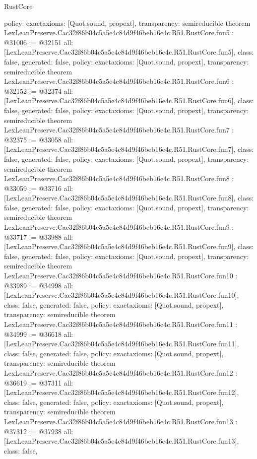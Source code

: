 \begin{lexlean}{RustCore}
\begin{coremodule}
{  policy: exact{axioms: [Quot.sound, propext]},
  transparency: semireducible
}
theorem LexLeanPreserve.Cac32f86b04c5a5e4c84d9f46beb16e4c.R51.RustCore.fun5 : @31006 := @32151 {
  all: [LexLeanPreserve.Cac32f86b04c5a5e4c84d9f46beb16e4c.R51.RustCore.fun5],
  class: false,
  generated: false,
  policy: exact{axioms: [Quot.sound, propext]},
  transparency: semireducible
}
theorem LexLeanPreserve.Cac32f86b04c5a5e4c84d9f46beb16e4c.R51.RustCore.fun6 : @32152 := @32374 {
  all: [LexLeanPreserve.Cac32f86b04c5a5e4c84d9f46beb16e4c.R51.RustCore.fun6],
  class: false,
  generated: false,
  policy: exact{axioms: [Quot.sound, propext]},
  transparency: semireducible
}
theorem LexLeanPreserve.Cac32f86b04c5a5e4c84d9f46beb16e4c.R51.RustCore.fun7 : @32375 := @33058 {
  all: [LexLeanPreserve.Cac32f86b04c5a5e4c84d9f46beb16e4c.R51.RustCore.fun7],
  class: false,
  generated: false,
  policy: exact{axioms: [Quot.sound, propext]},
  transparency: semireducible
}
theorem LexLeanPreserve.Cac32f86b04c5a5e4c84d9f46beb16e4c.R51.RustCore.fun8 : @33059 := @33716 {
  all: [LexLeanPreserve.Cac32f86b04c5a5e4c84d9f46beb16e4c.R51.RustCore.fun8],
  class: false,
  generated: false,
  policy: exact{axioms: [Quot.sound, propext]},
  transparency: semireducible
}
theorem LexLeanPreserve.Cac32f86b04c5a5e4c84d9f46beb16e4c.R51.RustCore.fun9 : @33717 := @33988 {
  all: [LexLeanPreserve.Cac32f86b04c5a5e4c84d9f46beb16e4c.R51.RustCore.fun9],
  class: false,
  generated: false,
  policy: exact{axioms: [Quot.sound, propext]},
  transparency: semireducible
}
theorem LexLeanPreserve.Cac32f86b04c5a5e4c84d9f46beb16e4c.R51.RustCore.fun10 : @33989 := @34998 {
  all: [LexLeanPreserve.Cac32f86b04c5a5e4c84d9f46beb16e4c.R51.RustCore.fun10],
  class: false,
  generated: false,
  policy: exact{axioms: [Quot.sound, propext]},
  transparency: semireducible
}
theorem LexLeanPreserve.Cac32f86b04c5a5e4c84d9f46beb16e4c.R51.RustCore.fun11 : @34999 := @36618 {
  all: [LexLeanPreserve.Cac32f86b04c5a5e4c84d9f46beb16e4c.R51.RustCore.fun11],
  class: false,
  generated: false,
  policy: exact{axioms: [Quot.sound, propext]},
  transparency: semireducible
}
theorem LexLeanPreserve.Cac32f86b04c5a5e4c84d9f46beb16e4c.R51.RustCore.fun12 : @36619 := @37311 {
  all: [LexLeanPreserve.Cac32f86b04c5a5e4c84d9f46beb16e4c.R51.RustCore.fun12],
  class: false,
  generated: false,
  policy: exact{axioms: [Quot.sound, propext]},
  transparency: semireducible
}
theorem LexLeanPreserve.Cac32f86b04c5a5e4c84d9f46beb16e4c.R51.RustCore.fun13 : @37312 := @37938 {
  all: [LexLeanPreserve.Cac32f86b04c5a5e4c84d9f46beb16e4c.R51.RustCore.fun13],
  class: false,
}
\end{coremodule}
\end{lexlean}
